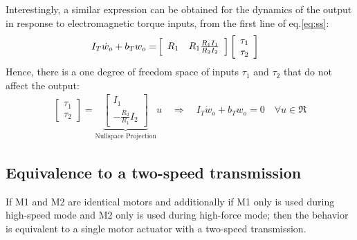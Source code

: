 Interestingly, a similar expression can be obtained for the dynamics of the output in response to electromagnetic torque inputs, from the first line of eq.\eqref{eq:ss}:
%
\begin{align}
I_T \dot{w}_o +
b_T  w_o
=&
\left[ \begin{array}{c c}
R_1 & R_1 \frac{R_1 I_1}{R_2 I_2}
\end{array} \right]
\left[ \begin{array}{c}
\tau_1 \\
\tau_2
\end{array} \right]
\label{eq:output}
\end{align}
% 
Hence, there is a one degree of freedom space of inputs $\tau_1$ and $\tau_2$ that do not affect the output:
\begin{align}
\left[ \begin{array}{c}
\tau_1 \\
\tau_2
\end{array} \right]
 = 
\underbrace{\left[ \begin{array}{c}
I_1 \\
-\frac{R_2 }{R_1 }  I_2
\end{array} \right]}_{\text{Nullspace Projection}} u
\quad \Rightarrow \quad
I_T \dot{w}_o +
b_T  w_o = 0 \quad \forall u \in \Re
\label{eq:dyn_null_proj}
\end{align}


\subsection{Equivalence to a two-speed transmission}

If M1 and M2 are identical motors and additionally if M1 only is used during high-speed mode and M2 only is used during high-force mode; then the behavior is equivalent to a single motor actuator with a two-speed transmission. 

